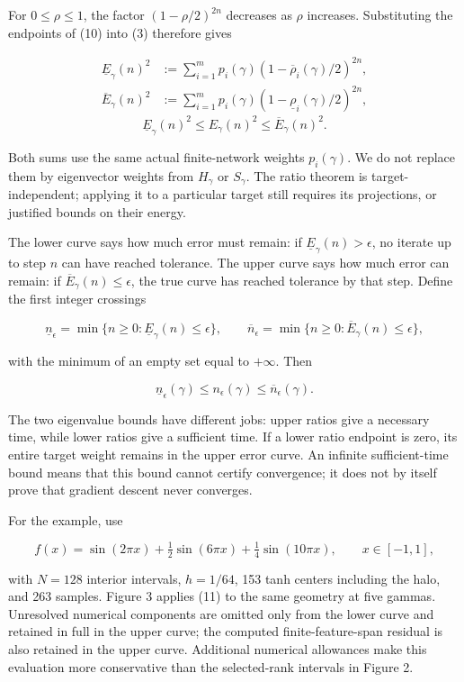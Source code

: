 \documentclass[11pt]{article}
\begin{document}
For \(0\le\rho\le1\), the factor \((1-\rho/2)^{2n}\) decreases as \(\rho\) increases. Substituting the endpoints of (10) into (3) therefore gives

\[
\begin{aligned}
\underline E_\gamma(n)^2
&:=\sum_{i=1}^{m}p_i(\gamma)(1-\overline\rho_i(\gamma)/2)^{2n},\\
\overline E_\gamma(n)^2
&:=\sum_{i=1}^{m}p_i(\gamma)(1-\underline\rho_i(\gamma)/2)^{2n},
\end{aligned}
\]
\[
\boxed{\underline E_\gamma(n)^2\le E_\gamma(n)^2\le\overline E_\gamma(n)^2.}
\tag{11}
\]

Both sums use the same actual finite-network weights \(p_i(\gamma)\). We do not replace them by eigenvector weights from \(H_\gamma\) or \(S_\gamma\). The ratio theorem is target-independent; applying it to a particular target still requires its projections, or justified bounds on their energy.

The lower curve says how much error must remain: if \(\underline E_\gamma(n)>\epsilon\), no iterate up to step \(n\) can have reached tolerance. The upper curve says how much error can remain: if \(\overline E_\gamma(n)\le\epsilon\), the true curve has reached tolerance by that step. Define the first integer crossings

\[
\underline n_\epsilon=\min\{n\ge0:\underline E_\gamma(n)\le\epsilon\},
\qquad
\overline n_\epsilon=\min\{n\ge0:\overline E_\gamma(n)\le\epsilon\},
\]

with the minimum of an empty set equal to \(+\infty\). Then

\[
\boxed{\underline n_\epsilon(\gamma)\le n_\epsilon(\gamma)\le\overline n_\epsilon(\gamma).}
\tag{12}
\]

The two eigenvalue bounds have different jobs: upper ratios give a necessary time, while lower ratios give a sufficient time. If a lower ratio endpoint is zero, its entire target weight remains in the upper error curve. An infinite sufficient-time bound means that this bound cannot certify convergence; it does not by itself prove that gradient descent never converges.

For the example, use

\[
f(x)=\sin(2\pi x)+\tfrac12\sin(6\pi x)+\tfrac14\sin(10\pi x),
\qquad x\in[-1,1],
\]

with \(N=128\) interior intervals, \(h=1/64\), 153 tanh centers including the halo, and 263 samples. Figure 3 applies (11) to the same geometry at five gammas. Unresolved numerical components are omitted only from the lower curve and retained in full in the upper curve; the computed finite-feature-span residual is also retained in the upper curve. Additional numerical allowances make this evaluation more conservative than the selected-rank intervals in Figure 2.
\end{document}
